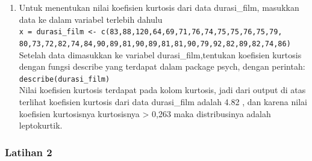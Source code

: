 \documentclass[a4paper,12pt]{article}
\begin{document}
\begin{enumerate}[label=\alph*.]
	\item Untuk menentukan nilai koefisien kurtosis dari data durasi\_film, masukkan data ke dalam variabel terlebih dahulu\\
	\texttt{x = durasi\_film <- c(83,88,120,64,69,71,76,74,75,75,76,75,79,\\
		80,73,72,82,74,84,90,89,81,90,89,81,81,90,79,92,82,89,82,74,86)\\}
	Setelah data dimasukkan ke variabel durasi\_film,tentukan koefisien kurtosis dengan fungsi describe yang terdapat dalam package psych, dengan perintah:\\
	\texttt{describe(durasi\_film)}\\
	Nilai koefisien kurtosis terdapat pada kolom kurtosis, jadi dari output di atas terlihat koefisien kurtosis dari data durasi\_film adalah 4.82 , dan karena nilai koefisien kurtosisnya kurtosisnya > 0,263 maka distribusinya adalah leptokurtik. 
\end{enumerate}

\subsubsection{Latihan 2}
\end{document}
